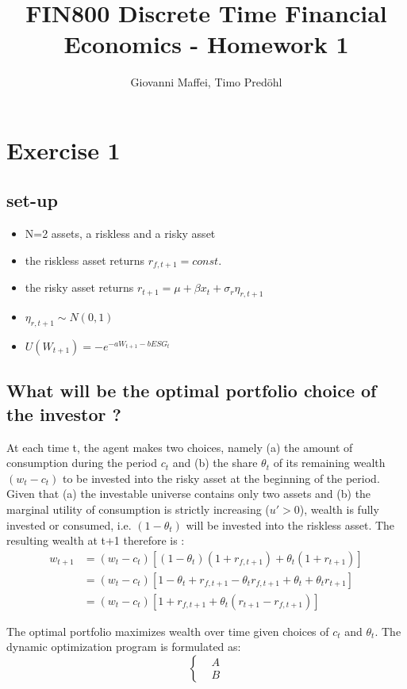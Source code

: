 \documentclass[]{article}
\title{FIN800 Discrete Time Financial Economics - Homework 1}
\author{Giovanni Maffei, Timo Predöhl}
\begin{document}
\maketitle

\section{Exercise 1}
\subsection{set-up}
\begin{itemize}
	\item N=2 assets, a riskless and a risky asset
	\item the riskless asset returns $r_{f, t+1} = const.$
	\item the risky asset returns $r_{t+1} = \mu + \beta x_t + \sigma_r \eta_{r, t+1}$
	\item $\eta_{r, t+1} \sim N(0,1)$
	\item  $U(W_{t+1}) = -e^{-aW_{t+1}-bESG_t}$
\end{itemize}

\subsection{What will be the optimal portfolio choice of the investor ?}
At each time t, the agent makes two choices, namely (a) the amount of consumption during the period $c_t$ and (b) the share $\theta_t$ of its remaining wealth $(w_t - c_t)$ to be invested into the risky asset at the beginning of the period. Given that (a) the investable universe contains only two assets and (b) the marginal utility of consumption is strictly increasing ($u'>0$), wealth is fully invested or consumed, i.e. $(1-\theta_t)$ will be invested into the riskless asset. The resulting wealth at t+1 therefore is :
\begin{align*}
	w_{t+1} &= (w_t - c_t)\left[(1-\theta_t)(1+r_{f, t+1})+ \theta_t(1+r_{t+1}) \right]\\
	&= (w_t - c_t) \left[1 -\theta_t + r_{f,t+1} - \theta_t r_{f,t+1} + \theta_t + \theta_t r_{t+1}\right]\\
	&= (w_t - c_t) \left[1 + r_{f,t+1} + \theta_t(r_{t+1}-r_{f, t+1}) \right]
\end{align*}



The optimal portfolio maximizes wealth over time given choices of $c_t$ and $\theta_t$. The dynamic optimization program is formulated as:
\begin{equation}
	\begin{cases}
		& A\\
		& B
	\end{cases}
\end{equation}
\end{document}
